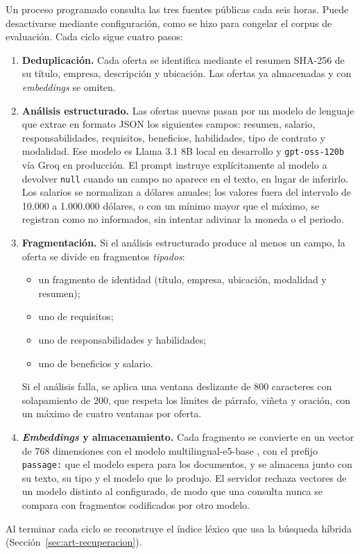 Un proceso programado consulta las tres fuentes públicas cada seis horas. Puede desactivarse mediante configuración, como se hizo para congelar el corpus de evaluación. Cada ciclo sigue cuatro pasos:
\begin{enumerate}
    \item \textbf{Deduplicación.} Cada oferta se identifica mediante el resumen SHA-256 de su título, empresa, descripción y ubicación. Las ofertas ya almacenadas y con \textit{embeddings} se omiten.
    \item \textbf{Análisis estructurado.} Las ofertas nuevas pasan por un modelo de lenguaje que extrae en formato JSON los siguientes campos: resumen, salario, responsabilidades, requisitos, beneficios, habilidades, tipo de contrato y modalidad. Ese modelo es Llama 3.1 8B local en desarrollo y \texttt{gpt-oss-120b} vía Groq en producción. El prompt instruye explícitamente al modelo a devolver \texttt{null} cuando un campo no aparece en el texto, en lugar de inferirlo. Los salarios se normalizan a dólares anuales; los valores fuera del intervalo de 10.000 a 1.000.000 dólares, o con un mínimo mayor que el máximo, se registran como no informados, sin intentar adivinar la moneda o el periodo.
    \item \textbf{Fragmentación.} Si el análisis estructurado produce al menos un campo, la oferta se divide en fragmentos \emph{tipados}:
    \begin{itemize}
        \item un fragmento de identidad (título, empresa, ubicación, modalidad y resumen);
        \item uno de requisitos;
        \item uno de responsabilidades y habilidades;
        \item uno de beneficios y salario.
    \end{itemize}
    Si el análisis falla, se aplica una ventana deslizante de 800 caracteres con solapamiento de 200, que respeta los límites de párrafo, viñeta y oración, con un máximo de cuatro ventanas por oferta.
    \item \textbf{\textit{Embeddings} y almacenamiento.} Cada fragmento se convierte en un vector de 768 dimensiones con el modelo multilingual-e5-base \citep{Wang2024mE5}, con el prefijo \texttt{passage:} que el modelo espera para los documentos, y se almacena junto con su texto, su tipo y el modelo que lo produjo. El servidor rechaza vectores de un modelo distinto al configurado, de modo que una consulta nunca se compara con fragmentos codificados por otro modelo.
\end{enumerate}
Al terminar cada ciclo se reconstruye el índice léxico que usa la búsqueda híbrida (Sección~\ref{sec:art-recuperacion}).

